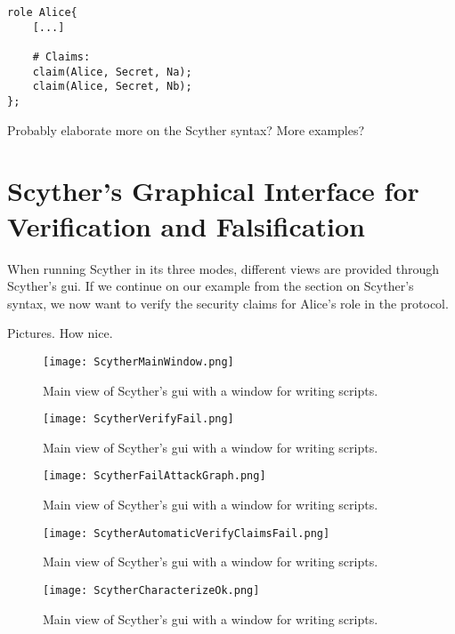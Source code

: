\begin{lstlisting}
role Alice{
	[...]
	
	# Claims:
	claim(Alice, Secret, Na);
	claim(Alice, Secret, Nb);
};
\end{lstlisting}


Probably elaborate more on the Scyther syntax? More examples? 

\section{Scyther's Graphical Interface for Verification and Falsification}

When running Scyther in its three modes, different views are provided through Scyther's \gls{gui}. If we continue on our example from the section on Scyther's syntax, we now want to verify the security claims for Alice's role in the protocol.

Pictures. How nice.

\begin{figure}
	\centering
	\texttt{[image: ScytherMainWindow.png]}
	\caption{Main view of Scyther's \gls{gui} with a window for writing scripts.}
	\label{fig:scythermain}
\end{figure}

\begin{figure}
	\centering
	\texttt{[image: ScytherVerifyFail.png]}
	\caption{Main view of Scyther's \gls{gui} with a window for writing scripts.}
	\label{fig:scytherverifyfail}
\end{figure}

\begin{figure}
	\centering
	\texttt{[image: ScytherFailAttackGraph.png]}
	\caption{Main view of Scyther's \gls{gui} with a window for writing scripts.}
	\label{fig:scytherfailgraph}
\end{figure}

\begin{figure}
	\centering
	\texttt{[image: ScytherAutomaticVerifyClaimsFail.png]}
	\caption{Main view of Scyther's \gls{gui} with a window for writing scripts.}
	\label{fig:scytherautomaticclaims}
\end{figure}

\begin{figure}
	\centering
	\texttt{[image: ScytherCharacterizeOk.png]}
	\caption{Main view of Scyther's \gls{gui} with a window for writing scripts.}
	\label{fig:scythercharacterize}
\end{figure}